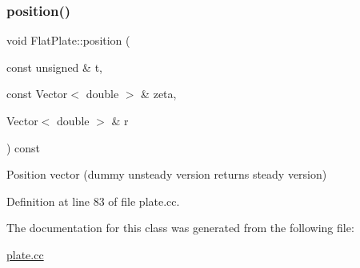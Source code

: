 \subsubsection{\texorpdfstring{position()}{position()}\hspace{0.1cm}{\footnotesize\ttfamily [2/2]}}
{\footnotesize\ttfamily void Flat\+Plate\+::position (\begin{DoxyParamCaption}\item[{const unsigned \&}]{t,  }\item[{const Vector$<$ double $>$ \&}]{zeta,  }\item[{Vector$<$ double $>$ \&}]{r }\end{DoxyParamCaption}) const\hspace{0.3cm}{\ttfamily [inline]}}



Position vector (dummy unsteady version returns steady version) 



Definition at line 83 of file plate.\+cc.



The documentation for this class was generated from the following file\+:\begin{DoxyCompactItemize}
\item 
\hyperlink{plate_8cc}{plate.\+cc}\end{DoxyCompactItemize}
